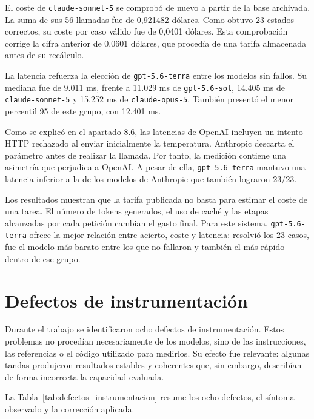 El coste de \texttt{claude-sonnet-5} se comprobó de nuevo a partir de la base archivada. La suma de sus 56 llamadas fue de 0,921482 dólares. Como obtuvo 23 estados correctos, su coste por caso válido fue de 0,0401 dólares. Esta comprobación corrige la cifra anterior de 0,0601 dólares, que procedía de una tarifa almacenada antes de su recálculo.

La latencia refuerza la elección de \texttt{gpt-5.6-terra} entre los modelos sin fallos. Su mediana fue de 9.011 ms, frente a 11.029 ms de \texttt{gpt-5.6-sol}, 14.405 ms de \texttt{claude-sonnet-5} y 15.252 ms de \texttt{claude-opus-5}. También presentó el menor percentil 95 de este grupo, con 12.401 ms.

Como se explicó en el apartado 8.6, las latencias de OpenAI incluyen un intento HTTP rechazado al enviar inicialmente la temperatura. Anthropic descarta el parámetro antes de realizar la llamada. Por tanto, la medición contiene una asimetría que perjudica a OpenAI. A pesar de ella, \texttt{gpt-5.6-terra} mantuvo una latencia inferior a la de los modelos de Anthropic que también lograron 23/23.

Los resultados muestran que la tarifa publicada no basta para estimar el coste de una tarea. El número de tokens generados, el uso de caché y las etapas alcanzadas por cada petición cambian el gasto final. Para este sistema, \texttt{gpt-5.6-terra} ofrece la mejor relación entre acierto, coste y latencia: resolvió los 23 casos, fue el modelo más barato entre los que no fallaron y también el más rápido dentro de ese grupo.


\section{Defectos de instrumentación}
\label{sec:defectos_instrumentacion}

Durante el trabajo se identificaron ocho defectos de instrumentación. Estos problemas no procedían necesariamente de los modelos, sino de las instrucciones, las referencias o el código utilizado para medirlos. Su efecto fue relevante: algunas tandas produjeron resultados estables y coherentes que, sin embargo, describían de forma incorrecta la capacidad evaluada.

La Tabla~\ref{tab:defectos_instrumentacion} resume los ocho defectos, el síntoma observado y la corrección aplicada.

